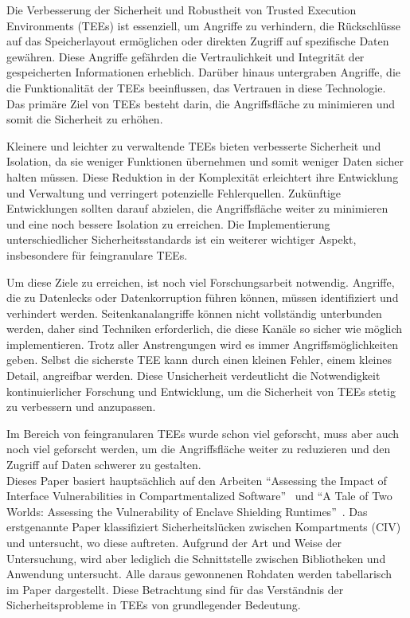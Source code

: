 
Die Verbesserung der Sicherheit und Robustheit von Trusted Execution Environments (TEEs) ist essenziell, um Angriffe zu verhindern, die Rückschlüsse auf das Speicherlayout ermöglichen oder direkten Zugriff auf spezifische Daten gewähren. Diese Angriffe gefährden die Vertraulichkeit und Integrität der gespeicherten Informationen erheblich. Darüber hinaus untergraben Angriffe, die die Funktionalität der TEEs beeinflussen, das Vertrauen in diese Technologie. Das primäre Ziel von TEEs besteht darin, die Angriffsfläche zu minimieren und somit die Sicherheit zu erhöhen.

Kleinere und leichter zu verwaltende TEEs bieten verbesserte Sicherheit und Isolation, da sie weniger Funktionen übernehmen und somit weniger Daten sicher halten müssen. Diese Reduktion in der Komplexität erleichtert ihre Entwicklung und Verwaltung und verringert potenzielle Fehlerquellen. Zukünftige Entwicklungen sollten darauf abzielen, die Angriffsfläche weiter zu minimieren und eine noch bessere Isolation zu erreichen. Die Implementierung unterschiedlicher Sicherheitsstandards ist ein weiterer wichtiger Aspekt, insbesondere für feingranulare TEEs.

Um diese Ziele zu erreichen, ist noch viel Forschungsarbeit notwendig. 
Angriffe, die zu Datenlecks oder Datenkorruption führen können, müssen identifiziert und verhindert werden. Seitenkanalangriffe können nicht vollständig unterbunden werden, daher sind Techniken erforderlich, die diese Kanäle so sicher wie möglich implementieren. 
Trotz aller Anstrengungen wird es immer Angriffsmöglichkeiten geben. Selbst die sicherste TEE kann durch einen kleinen Fehler, einem kleines Detail, angreifbar werden. Diese Unsicherheit verdeutlicht die Notwendigkeit kontinuierlicher Forschung und Entwicklung, um die Sicherheit von TEEs stetig zu verbessern und anzupassen.

Im Bereich von feingranularen TEEs wurde schon viel geforscht, muss aber auch noch viel geforscht werden, um die Angriffsfläche weiter zu reduzieren und den Zugriff auf Daten schwerer zu gestalten.
\\
Dieses Paper basiert hauptsächlich auf den Arbeiten \enquote{Assessing the Impact of Interface Vulnerabilities in Compartmentalized Software}~\cite{CIVPaper} und \enquote{A Tale of Two Worlds: Assessing the Vulnerability of Enclave Shielding Runtimes}~\cite{TEEPaper}. 
Das erstgenannte Paper klassifiziert Sicherheitslücken zwischen Kompartments (CIV) und untersucht, wo diese auftreten. Aufgrund der Art und Weise der Untersuchung, wird aber lediglich die Schnittstelle zwischen Bibliotheken und Anwendung untersucht. 
Alle daraus gewonnenen Rohdaten werden tabellarisch im Paper dargestellt. 
Diese Betrachtung sind für das Verständnis der Sicherheitsprobleme in TEEs von grundlegender Bedeutung.

